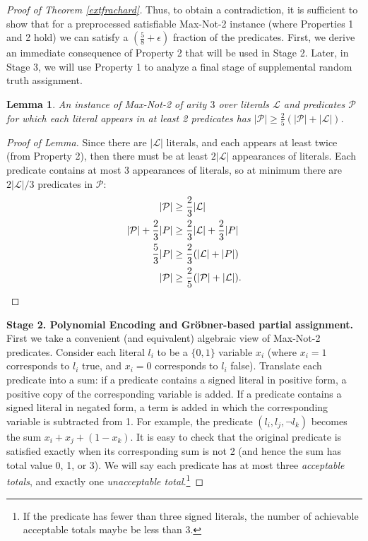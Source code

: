 \documentclass{article}
\newtheorem{lem}[thm]{Lemma}
\begin{document}
\begin{proof}[Proof of Theorem \ref{extfrachard}]
\vspace{1mm}

\noindent 
Thus, to obtain a contradiction, it is sufficient to show that for a preprocessed satisfiable Max-Not-2 instance (where Properties 1 and 2 hold)  we can satisfy a $(\frac{5}{8}+\epsilon)$ fraction of the predicates. First, we derive an immediate consequence of Property 2 that will be used in Stage 2. Later, in Stage 3, we will use Property 1 to analyze a final stage of supplemental random truth assignment. 
\begin{lem} \label{twofifths} An instance of \textit{Max-Not-2} of arity $3$ over literals $\mathcal{L}$ and predicates $\mathcal{P}$ for which each literal appears in at least 2 predicates has $|\mathcal{P}|\geq \frac{2}{5}(|\mathcal{P}|+|\mathcal{L}|)$.
\end{lem}


\begin{proof}[Proof of Lemma] Since there are $|\mathcal{L}|$ literals, and each appears at least twice (from Property 2), then there must be at least $2|\mathcal{L}|$ appearances of literals. Each predicate contains at most 3 appearances of literals, so at minimum there are $2|\mathcal{L}|/3$ predicates in $\mathcal{P}$:
\vspace{-4mm}
\begin{align*}
|\mathcal{P}|&\geq \frac{2}{3} |\mathcal{L}|\\
|\mathcal{P}|+\frac{2}{3}|P|&\geq \frac{2}{3} |\mathcal{L}|+\frac{2}{3}|P|\\
\frac{5}{3}|P|&\geq \frac{2}{3} (|\mathcal{L}|+|P|)\\
|\mathcal{P}|&\geq \frac{2}{5}(|\mathcal{P}|+|\mathcal{L}|).\text{\qedhere}
\end{align*}
\end{proof}

\noindent \textbf{Stage 2. Polynomial Encoding and Gr\"{o}bner-based partial assignment.} 
First we take a convenient (and equivalent) algebraic view of Max-Not-2 predicates.  Consider each literal $l_i$ to be a $\{0,1\}$ variable $x_i$ (where $x_i=1$ corresponds to $l_i$ true, and $x_i=0$ corresponds to $l_i$ false). Translate each predicate into a sum:  if a predicate contains a signed literal in positive form, a positive copy of the corresponding variable is added. If a predicate contains a signed literal in negated form, a term is added in which the corresponding variable is subtracted from 1. For example, the predicate $(l_i,l_j,\neg l_k)$ becomes the sum $x_i+x_j+(1-x_k)$. It is easy to check that the original predicate is satisfied exactly when its corresponding sum is not 2 (and hence the sum has total value 0, 1, or 3). We will say each predicate has at most three \emph{acceptable totals}, and exactly one \emph{unacceptable total}.\footnote{If the predicate has fewer than three signed literals, the number of achievable acceptable totals maybe be less than 3.}



\end{proof}
\end{document}
